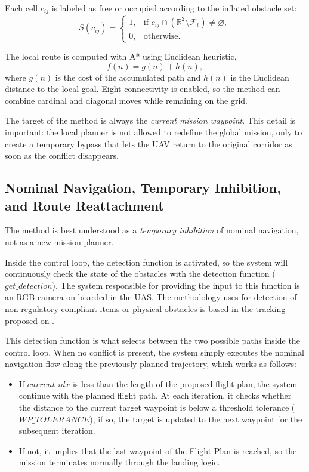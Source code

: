 \documentclass[drones,article,submit,moreauthors]{Definitions/mdpi}
\begin{document}
Each cell \(c_{ij}\) is labeled as free or occupied according to the inflated obstacle set:
\begin{equation}
    S(c_{ij}) =
    \begin{cases}
        1, & \text{if } c_{ij} \cap \left(\mathbb{R}^2 \setminus \mathcal{F}_t\right) \neq \varnothing,\\
        0, & \text{otherwise.}
    \end{cases}
\end{equation}

The local route is computed with A* \cite{hart1968formal} using Euclidean heuristic,
\begin{equation}
    f(n) = g(n) + h(n),
\end{equation}
where \(g(n)\) is the cost of the accumulated path and \(h(n)\) is the Euclidean distance to the local goal. Eight-connectivity is enabled, so the method can combine cardinal and diagonal moves while remaining on the grid.

The target of the method is always the \emph{current mission waypoint}. This detail is important: the local planner is not allowed to redefine the global mission, only to create a temporary bypass that lets the UAV return to the original corridor as soon as the conflict disappears.

\subsection{Nominal Navigation, Temporary Inhibition, and Route Reattachment}

The method is best understood as a \emph{temporary inhibition} of nominal navigation, not as a new mission planner. 

Inside the control loop, the detection function is activated, so the system will continuously check the state of the obstacles with the detection function ($get\_detection$). The system responsible for providing the input to this function is an RGB camera on-boarded in the UAS. The methodology uses for detection of non regulatory compliant items or physical obstacles is based in the tracking proposed on \cite{alaez2023real}.

This detection function is what selects between the two possible paths inside the control loop. When no conflict is present, the system simply executes the nominal navigation flow along the previously planned trajectory, which works as follows: 
\begin{itemize}
    \item If $current\_idx$ is less than the length of the proposed flight plan, the system continue with the planned flight path. At each iteration, it checks whether the distance to the current target waypoint is below a threshold tolerance ($WP\_TOLERANCE$); if so, the target is updated to the next waypoint for the subsequent iteration. 
    \item If not, it implies that the last waypoint of the Flight Plan is reached, so the mission terminates normally through the landing logic.
\end{itemize}
\end{document}
